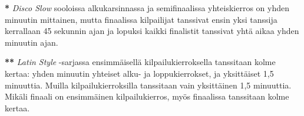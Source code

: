 \documentclass[12pt, a4paper, oneside]{article}
\begin{document}
\textbf{*} \textit{Disco Slow} sooloissa alkukarsinnassa ja semifinaalissa yhteiskierros on yhden minuutin mittainen,
mutta finaalissa kilpailijat tanssivat ensin yksi tanssija kerrallaan 45 sekunnin ajan ja lopuksi kaikki finalistit tanssivat yhtä aikaa yhden minuutin ajan.

\textbf{**} \textit{Latin Style} -sarjassa ensimmäisellä kilpailukierroksella tanssitaan kolme kertaa: yhden minuutin yhteiset alku- ja loppukierrokset,
ja yksittäiset 1,5 minuuttia.
Muilla kilpailukierroksilla tanssitaan vain yksittäinen 1,5 minuuttia.
Mikäli finaali on ensimmäinen kilpailukierros,
myös finaalissa tanssitaan kolme kertaa.

\end{document}
